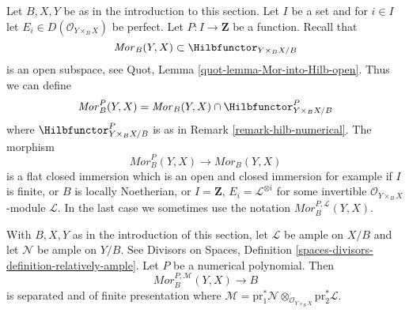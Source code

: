 \begin{remark}
\label{remark-Mor-numerical}
Let $B, X, Y$ be as in the introduction to this section.
Let $I$ be a set and for $i \in I$ let
$E_i \in D(\mathcal{O}_{Y \times_B X})$ be perfect.
Let $P : I \to \mathbf{Z}$ be a function. Recall that
$$
\mathit{Mor}_B(Y, X) \subset
\Hilbfunctor_{Y \times_B X/B}
$$
is an open subspace, see Quot, Lemma \ref{quot-lemma-Mor-into-Hilb-open}.
Thus we can define
$$
\mathit{Mor}^P_B(Y, X) =
\mathit{Mor}_B(Y, X) \cap \Hilbfunctor^P_{Y \times_B X/B}
$$
where $\Hilbfunctor^P_{Y \times_B X/B}$ is as in
Remark \ref{remark-hilb-numerical}. The morphism
$$
\mathit{Mor}^P_B(Y, X) \longrightarrow \mathit{Mor}_B(Y, X)
$$
is a flat closed immersion which is an open and closed immersion
for example if $I$ is finite, or $B$ is locally Noetherian, or
$I = \mathbf{Z}$, $E_i = \mathcal{L}^{\otimes i}$
for some invertible $\mathcal{O}_{Y \times_B X}$-module $\mathcal{L}$.
In the last case we sometimes use the notation
$\mathit{Mor}^{P, \mathcal{L}}_B(Y, X)$.
\end{remark}

\begin{lemma}
\label{lemma-Mor-qc-over-base}
With $B, X, Y$ as in the introduction of this section, let
$\mathcal{L}$ be ample on $X/B$ and let $\mathcal{N}$ be ample on $Y/B$.
See Divisors on Spaces, Definition
\ref{spaces-divisors-definition-relatively-ample}.
Let $P$ be a numerical polynomial. Then
$$
\mathit{Mor}^{P, \mathcal{M}}_B(Y, X) \longrightarrow B
$$
is separated and of finite presentation where
$\mathcal{M} = \text{pr}_1^*\mathcal{N}
\otimes_{\mathcal{O}_{Y \times_B X}} \text{pr}_2^*\mathcal{L}$.
\end{lemma}

